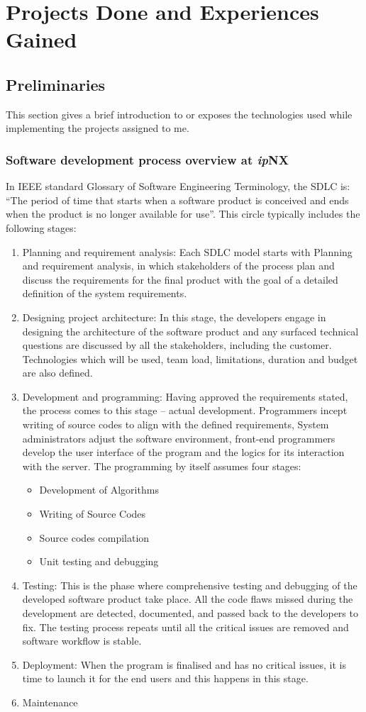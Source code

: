 \chapter{Projects Done and Experiences Gained}
\section{Preliminaries}
This section gives a brief introduction to or exposes the technologies used while implementing the projects assigned to me.
\subsection{Software development process overview at \textit{ip}NX}
In IEEE standard Glossary of Software Engineering
Terminology, the \ac{SDLC} is: “The period of time
that starts when a software product is conceived and ends
when the product is no longer available for use”. This circle typically includes the following stages:
\begin{enumerate}
	\item Planning and requirement analysis: Each \ac{SDLC} model starts with Planning and requirement analysis, in which stakeholders of the process plan and discuss the requirements for the final product with the goal of a detailed definition of the system requirements.
	\item Designing project architecture: In this stage, the developers engage in designing the architecture of the software product and any surfaced technical questions are discussed by all the stakeholders, including the customer. Technologies which will be used, team load, limitations, duration and budget are also defined.
	\item Development and programming: Having approved the requirements stated, the process comes to this stage – actual development. Programmers incept writing of source codes to align with the defined requirements, System administrators adjust the software environment, front-end programmers develop the user interface of the program and the logics for its interaction with the server. 
	The programming by itself assumes four stages:
	\begin{itemize}
		\item Development of Algorithms
		\item Writing of Source Codes
		\item Source codes compilation
		\item Unit testing and debugging
	\end{itemize}
	\item Testing: This is the phase where comprehensive testing and debugging of the developed software product take place. All the code flaws missed during the development are detected, documented, and passed back to the developers to fix. The testing process repeats until all the critical issues are removed and software workflow is stable.
	\item Deployment: When the program is finalised and has no critical issues, it is time to launch it for the end users and this happens in this stage.
	\item Maintenance
\end{enumerate}


